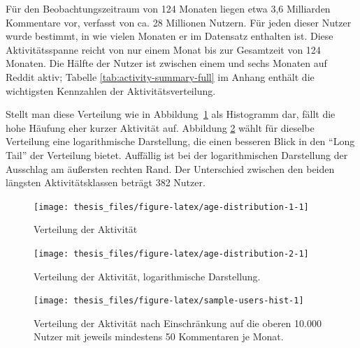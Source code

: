 \documentclass[11pt,a4paper,twoside]{article}
\begin{document}
Für den Beobachtungszeitraum von 124 Monaten liegen etwa 3,6 Milliarden
Kommentare vor, verfasst von ca. 28 Millionen Nutzern. Für jeden dieser
Nutzer wurde bestimmt, in wie vielen Monaten er im Datensatz enthalten
ist. Diese Aktivitätsspanne reicht von nur einem Monat bis zur
Gesamtzeit von 124 Monaten. Die Hälfte der Nutzer ist zwischen einem und
sechs Monaten auf Reddit aktiv; Tabelle \ref{tab:activity-summary-full}
im Anhang enthält die wichtigsten Kennzahlen der Aktivitätsverteilung.

Stellt man diese Verteilung wie in
Abbildung~\ref{fig:age-distribution-1} als Histogramm dar, fällt die
hohe Häufung eher kurzer Aktivität auf. Abbildung
\ref{fig:age-distribution-2} wählt für dieselbe Verteilung eine
logarithmische Darstellung, die einen besseren Blick in den
\enquote{Long Tail} der Verteilung bietet. Auffällig ist bei der
logarithmischen Darstellung der Ausschlag am äußersten rechten Rand. Der
Unterschied zwischen den beiden längsten Aktivitätsklassen beträgt 382
Nutzer.

\begin{figure}

{\centering \texttt{[image: thesis\_files/figure-latex/age-distribution-1-1]} 

}

\caption{Verteilung der Aktivität}\label{fig:age-distribution-1}
\end{figure}

\begin{figure}

{\centering \texttt{[image: thesis\_files/figure-latex/age-distribution-2-1]} 

}

\caption{Verteilung der Aktivität, logarithmische Darstellung.}\label{fig:age-distribution-2}
\end{figure}

\begin{figure}

{\centering \texttt{[image: thesis\_files/figure-latex/sample-users-hist-1]} 

}

\caption{Verteilung der Aktivität nach Einschränkung auf die oberen 10.000 Nutzer mit jeweils mindestens 50 Kommentaren je Monat.}\label{fig:sample-users-hist}
\end{figure}
\end{document}

